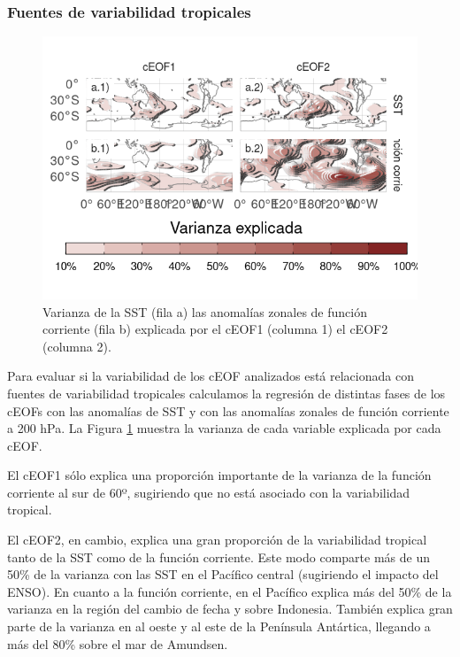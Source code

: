 \documentclass[12pt,oneside]{reedthesis}
\begin{document}
\hypertarget{fuentes-de-variabilidad-tropicales}{%
\subsubsection{Fuentes de variabilidad tropicales}\label{fuentes-de-variabilidad-tropicales}}



\begin{figure}
\includegraphics{figures/20-ceofs/psi-sst-explained-variance-1} \caption{Varianza de la SST (fila a) las anomalías zonales de función corriente (fila b) explicada por el cEOF1 (columna 1) el cEOF2 (columna 2).}\label{fig:psi-sst-explained-variance}
\end{figure}

Para evaluar si la variabilidad de los cEOF analizados está relacionada con fuentes de variabilidad tropicales calculamos la regresión de distintas fases de los cEOFs con las anomalías de SST y con las anomalías zonales de función corriente a 200 hPa.
La Figura \ref{fig:psi-sst-explained-variance} muestra la varianza de cada variable explicada por cada cEOF.

El cEOF1 sólo explica una proporción importante de la varianza de la función corriente al sur de 60º, sugiriendo que no está asociado con la variabilidad tropical.

El cEOF2, en cambio, explica una gran proporción de la variabilidad tropical tanto de la SST como de la función corriente.
Este modo comparte más de un 50\% de la varianza con las SST en el Pacífico central (sugiriendo el impacto del ENSO).
En cuanto a la función corriente, en el Pacífico explica más del 50\% de la varianza en la región del cambio de fecha y sobre Indonesia.
También explica gran parte de la varianza en al oeste y al este de la Península Antártica, llegando a más del 80\% sobre el mar de Amundsen.
\end{document}
